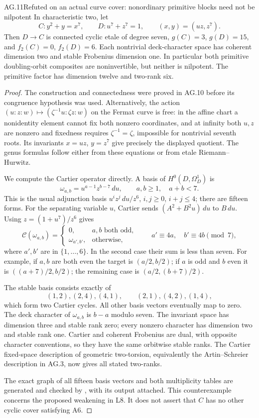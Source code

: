 \begin{claim}{AG.11}{Refuted on an actual curve cover: nonordinary primitive blocks need not be nilpotent}
In characteristic two, let
\[
 C:y^2+y=x^7,\qquad
 D:u^7+z^7=1,\qquad
 (x,y)=(uz,z^7).
\]
Then $D\to C$ is connected cyclic etale of degree seven,
$g(C)=3$, $g(D)=15$, and $f_2(C)=0$, $f_2(D)=6$.
Each nontrivial deck-character space has coherent
dimension two and stable Frobenius dimension one. In
particular both primitive doubling-orbit composites are
noninvertible, but neither is nilpotent. The primitive
factor has dimension twelve and two-rank six.
\end{claim}
\begin{proof}
The construction and connectedness were proved in AG.10
before its congruence hypothesis was used. Alternatively,
the action
$(u:z:w)\mapsto(\zeta^{-1}u:\zeta z:w)$ on the Fermat
curve is free: in the affine chart a nonidentity element
cannot fix both nonzero coordinates, and at infinity
both $u,z$ are nonzero and fixedness requires
$\zeta^{-1}=\zeta$, impossible for nontrivial seventh
roots. Its invariants $x=uz$, $y=z^7$ give precisely the
displayed quotient. The genus formulas follow either
from these equations or from etale Riemann--Hurwitz.

We compute the Cartier operator directly. A basis of
$H^0(D,\Omega_D^1)$ is
\[
 \omega_{a,b}=u^{a-1}z^{b-7}\,du,\qquad
      a,b\ge1,\quad a+b<7.
\]
This is the usual adjunction basis
$u^i z^j\,du/z^6$, $i,j\ge0$, $i+j\le4$;
there are fifteen forms. For the separating variable $u$,
Cartier sends $(A^2+B^2u)\,du$ to $B\,du$.
Using $z=(1+u^7)/z^6$ gives
\[
 \mathcal C(\omega_{a,b})=
 \begin{cases}
 0,&a,b\text{ both odd},\\
 \omega_{a',b'},&\text{otherwise},
 \end{cases}
 \qquad
 a'\equiv4a,\quad b'\equiv4b\pmod7,
\]
where $a',b'$ are in $\{1,\ldots,6\}$. In the second
case their sum is less than seven. For example, if
$a,b$ are both even the target is $(a/2,b/2)$;
if $a$ is odd and $b$ even it is $((a+7)/2,b/2)$;
the remaining case is $(a/2,(b+7)/2)$.

The stable basis consists exactly of
\[
             (1,2),(2,4),(4,1),\qquad
             (2,1),(4,2),(1,4),
\]
which form two Cartier cycles. All other basis vectors
eventually map to zero. The deck character of
$\omega_{a,b}$ is $b-a$ modulo seven. The invariant
space has dimension three and stable rank zero; every
nonzero character has dimension two and stable rank one.
Cartier and coherent Frobenius are dual, with opposite
character conventions, so they have the same orbitwise
stable ranks. The Cartier fixed-space description of
geometric two-torsion, equivalently the Artin--Schreier
description in AG.3, now gives all stated two-ranks.

The exact graph of all fifteen basis vectors and both
multiplicity tables are generated and checked by
, with its output
attached. This counterexample concerns the proposed
weakening in L8. It does not assert that $C$ has no other
cyclic cover satisfying A6.
\end{proof}

